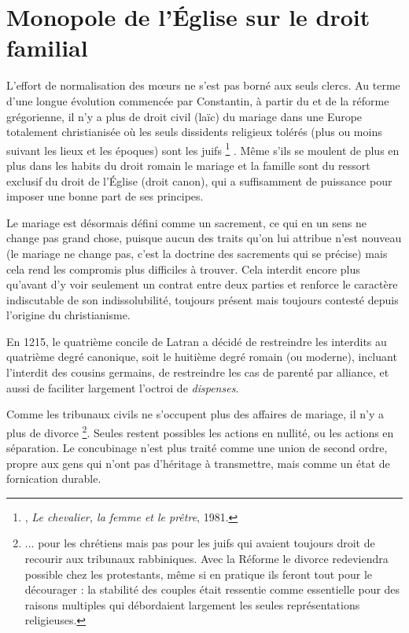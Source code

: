  

\section{Monopole de l'Église sur le droit familial}

 L'effort de normalisation des mœurs ne s'est pas borné aux seuls clercs. Au terme d'une longue évolution commencée par Constantin, à partir du  et de la réforme grégorienne, il n'y a plus de droit civil (laïc) du mariage dans une Europe totalement christianisée où les seuls dissidents religieux tolérés (plus ou moins suivant les lieux et les époques) sont les juifs
\footnote{, \emph{Le chevalier, la femme et le prêtre}, 1981.}%
. Même s'ils se moulent de plus en plus dans les habits du droit romain le mariage et la famille sont du ressort exclusif du droit de l'Église (droit canon), qui a suffisamment de puissance pour imposer une bonne part de ses principes. 

Le mariage est désormais défini comme un sacrement, ce qui en un sens ne change pas grand chose, puisque aucun des traits qu'on lui attribue n'est nouveau (le mariage ne change pas, c'est la doctrine des sacrements qui se précise) mais cela rend les compromis plus difficiles à trouver. Cela interdit encore plus qu'avant d'y voir seulement un contrat entre deux parties et renforce le caractère indiscutable de son indissolubilité, toujours présent mais toujours contesté depuis l'origine du christianisme. 

 En 1215, le quatrième concile de Latran a décidé de restreindre les interdits au quatrième degré canonique, soit le huitième degré romain (ou moderne), incluant l'interdit des cousins germains, de restreindre les cas de parenté par alliance, et aussi de faciliter largement l'octroi de \emph{dispenses}.

 Comme les tribunaux civils ne s'occupent plus des affaires de mariage, il n'y a plus de divorce%
\footnote{... pour les chrétiens mais pas pour les juifs qui avaient toujours droit de recourir aux tribunaux rabbiniques. Avec la Réforme le divorce redeviendra possible chez les protestants, même si en pratique ils feront tout pour le décourager : la stabilité des couples était ressentie comme essentielle pour des raisons multiples qui débordaient largement les seules représentations religieuses.}. 
Seules restent possibles les actions en nullité, ou les actions en séparation. Le concubinage n'est plus traité comme une union de second ordre, propre aux gens qui n'ont pas d'héritage à transmettre, mais comme un état de fornication durable.




